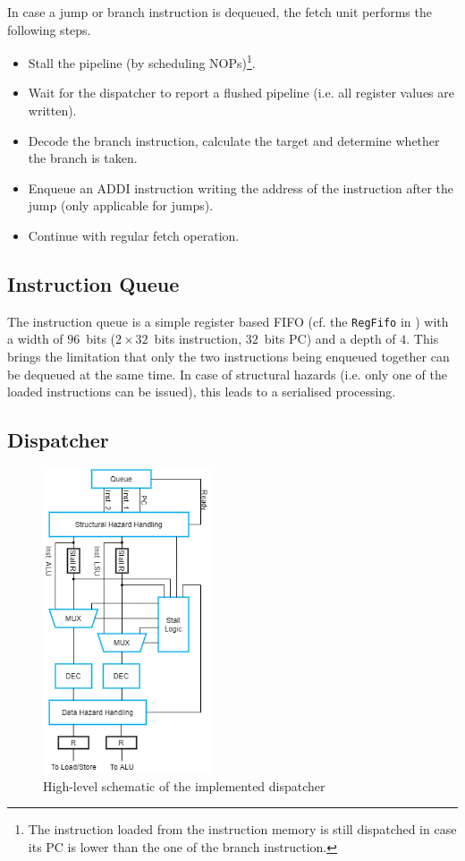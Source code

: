 \documentclass[conference]{IEEEtran}
\begin{document}
In case a jump or branch instruction is dequeued, the fetch unit performs the following steps.
\begin{itemize}
	\item Stall the pipeline (by scheduling NOPs)\footnote{The instruction loaded from the instruction memory is still dispatched in case its PC is lower than the one of the branch instruction.}.
	\item Wait for the dispatcher to report a flushed pipeline (i.e. all register values are written).
	\item Decode the branch instruction, calculate the target and determine whether the branch is taken.
	\item Enqueue an ADDI instruction writing the address of the instruction after the jump (only applicable for jumps).
	\item Continue with regular fetch operation.
\end{itemize}

\subsection{Instruction Queue}
The instruction queue is a simple register based FIFO (cf. the \verb|RegFifo| in \cite{schoeberl}) with a width of $96$~bits ($2\times32$~bits instruction, $32$~bits PC) and a depth of $4$. This brings the limitation that only the two instructions being enqueued together can be dequeued at the same time. In case of structural hazards (i.e. only one of the loaded instructions can be issued), this leads to a serialised processing.

\subsection{Dispatcher} \label{sec:dispatch}

\begin{figure}
	\centering
	\includegraphics[width=5cm]{dispatcher.png}
	\caption{High-level schematic of the implemented dispatcher}
	\label{fig:dispatcher}
\end{figure}
\end{document}
